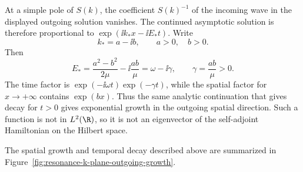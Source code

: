 At a simple pole of \(S(k)\), the coefficient \(S(k)^{-1}\) of the incoming
wave in the displayed outgoing solution vanishes.  The continued asymptotic
solution is therefore proportional to
\(\exp(\ii k_\ast x-\ii E_\ast t)\).  Write
\[
  k_\ast=a-\ii b,\qquad a>0,\quad b>0 .
\]
Then
\[
  E_\ast=\frac{a^2-b^2}{2\mu}-\ii\frac{ab}{\mu}
  =
  \omega-\ii\gamma,
  \qquad
  \gamma=\frac{ab}{\mu}>0.
\]
The time factor is \(\exp(-\ii\omega t)\exp(-\gamma t)\), while the spatial
factor for \(x\to+\infty\) contains \(\exp(bx)\).  Thus the same analytic
continuation that gives decay for \(t>0\) gives exponential growth in the
outgoing spatial direction.  Such a function is not in \(L^2(\R)\), so it is
not an eigenvector of the self-adjoint Hamiltonian on the Hilbert space.

The spatial growth and temporal decay described above are summarized in
Figure~\ref{fig:resonance-k-plane-outgoing-growth}.
